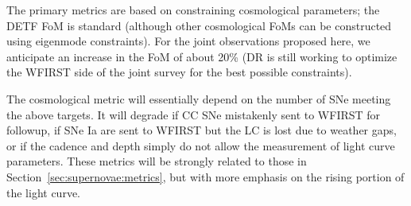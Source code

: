 
The primary metrics are based on constraining cosmological parameters; the DETF FoM is standard (although other cosmological FoMs can be constructed using eigenmode constraints). For the joint observations proposed here, we anticipate an increase in the FoM of about 20\% (DR is still working to optimize the WFIRST side of the joint survey for the best possible constraints).

The cosmological metric will essentially depend on the number of SNe meeting the above targets. It will degrade if CC SNe mistakenly sent to WFIRST for followup, if SNe Ia are sent to WFIRST but the LC is lost due to weather gaps, or if the cadence and depth simply do not allow the measurement of light curve parameters. These metrics will be strongly related to those in Section~\ref{sec:supernovae:metrics}, but with more emphasis on the rising portion of the light curve.








